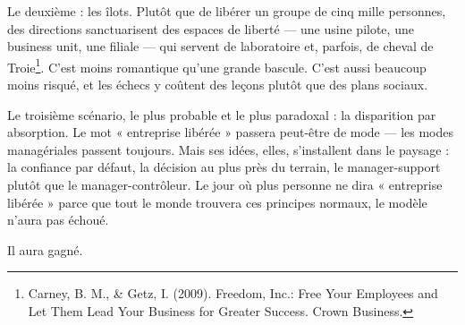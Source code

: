 Le deuxième : les îlots. Plutôt que de libérer un groupe de cinq mille personnes, des directions sanctuarisent des espaces de liberté — une usine pilote, une business unit, une filiale — qui servent de laboratoire et, parfois, de cheval de Troie\footnote{Carney, B. M., \& Getz, I. (2009). Freedom, Inc.: Free Your Employees and Let Them Lead Your Business for Greater Success. Crown Business.}. C'est moins romantique qu'une grande bascule. C'est aussi beaucoup moins risqué, et les échecs y coûtent des leçons plutôt que des plans sociaux.

Le troisième scénario, le plus probable et le plus paradoxal : la disparition par absorption. Le mot « entreprise libérée » passera peut-être de mode — les modes managériales passent toujours. Mais ses idées, elles, s'installent dans le paysage : la confiance par défaut, la décision au plus près du terrain, le manager-support plutôt que le manager-contrôleur. Le jour où plus personne ne dira « entreprise libérée » parce que tout le monde trouvera ces principes normaux, le modèle n'aura pas échoué.

Il aura gagné.
